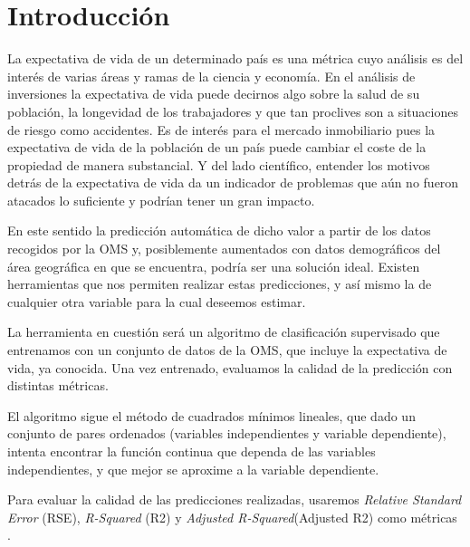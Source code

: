 \section{Introducción}
    La expectativa de vida de un determinado país es una métrica cuyo análisis es del interés de varias áreas y ramas de la ciencia y economía. En el análisis de inversiones la expectativa de vida puede decirnos algo sobre la salud de su población, la longevidad de los trabajadores y que tan proclives son a situaciones de riesgo como accidentes.
    Es de interés para el mercado inmobiliario pues la expectativa de vida de la población de un país puede cambiar el coste de la propiedad de manera substancial. Y del lado científico, entender los motivos detrás de la expectativa de vida da un indicador de problemas que aún no fueron atacados lo suficiente y podrían tener un gran impacto.
    
    En este sentido la predicción automática de dicho valor a partir de los datos recogidos por la OMS y, posiblemente aumentados con datos demográficos del área geográfica en que se encuentra, podría ser una solución ideal. Existen herramientas que nos permiten realizar estas predicciones, y así mismo la de cualquier otra variable para la cual deseemos estimar. 
    
    La herramienta en cuestión será un algoritmo de clasificación supervisado que entrenamos con un conjunto de datos de la OMS, que incluye la expectativa de vida, ya conocida. Una vez entrenado, evaluamos la calidad de la predicción con distintas métricas.
    
    El algoritmo sigue el método de cuadrados mínimos lineales\cite{MLS:qhe}, que dado un conjunto de pares ordenados (variables independientes y variable dependiente), intenta encontrar la función continua que dependa de las variables independientes, y que mejor se aproxime a la variable dependiente.
    
    Para evaluar la calidad de las predicciones realizadas, usaremos  \textit{Relative Standard Error} (RSE), \textit{R-Squared} (R2) y \textit{Adjusted R-Squared}(Adjusted R2) como métricas \cite{Met:qhe}.
    

